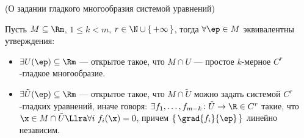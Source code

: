 \begin{theorem}(О задании гладкого многообразия системой уравнений)

    Пусть $M \subseteq \Rm$, $1 \leqslant k < m$, $r \in \N \cup
    \{\,+\infty\,\}$, тогда $\forall \ep \in M$ эквивалентны утверждения:
    \begin{itemize}
        \item $\exists U(\ep) \subseteq \Rm$ --- открытое такое, что
        $M \cap U$ --- простое $k$-мерное $C^r$-гладкое многообразие.
        \item $\exists \tilde{U}(\ep) \subseteq \Rm$ --- открытое такое,
        что $M \cap \tilde{U}$ можно задать системой $C^r$-гладких уравнений,
        иначе говоря: $\exists f_1, \ldots, f_{m - k} \colon \tilde{U} \to \R
        \in C^r$ такие, что \\ $\x \in M \cap \tilde{U} \Llra \forall i~
        f_i(\x) = 0$, причем $\{\,\grad{f_i}{\ep}\,\}$ линейно независим.
    \end{itemize}
\end{theorem}
